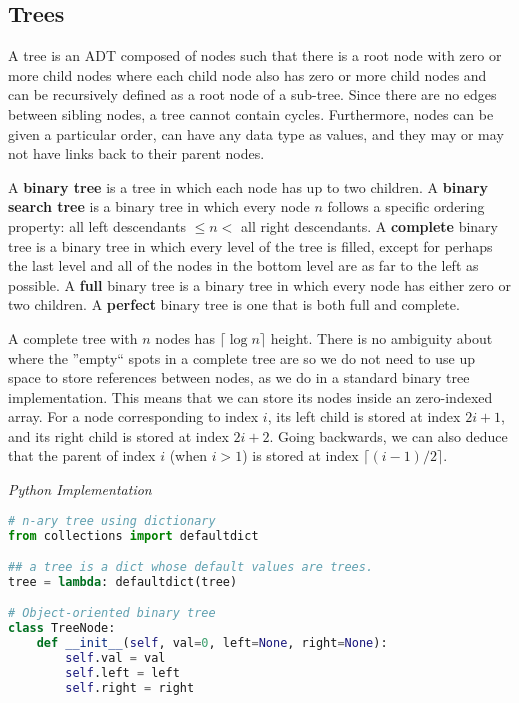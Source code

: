 \documentclass{article}
\begin{document}
    \subsection{Trees}
    A tree is an ADT composed of nodes such that there is a root node with zero or more child nodes where each child node also has zero or more child nodes and can be recursively defined as a root node of a sub-tree. Since there are no edges between sibling nodes, a tree cannot contain cycles. Furthermore, nodes can be given a particular order, can have any data type as values, and they may or may not have links back to their parent nodes.
    
    A \textbf{binary tree} is a tree in which each node has up to two children. A \textbf{binary search tree} is a binary tree in which every node $n$ follows a specific ordering property: all left descendants $\leq n <$ all right descendants. A \textbf{complete} binary tree is a binary tree in which every level of the tree is filled, except for perhaps the last level and all of the nodes in the bottom level are as far to the left as possible. A \textbf{full} binary tree is a binary tree in which every node has either zero or two children. A \textbf{perfect} binary tree is one that is both full and complete.
    
    A complete tree with $n$ nodes has $\lceil \log n \rceil$ height. There is no ambiguity about where the ''empty`` spots in a complete tree are so we do not need to use up space to store references between nodes, as we do in a standard binary tree implementation. This means that we can store its nodes inside an zero-indexed array. For a node corresponding to index $i$, its left child is stored at index $2i + 1$, and its right child is stored at index $2i + 2$. Going backwards, we can also deduce that the parent of index $i$ (when $i > 1$) is stored at index $\lceil (i-1)/2 \rceil$.

\vspace{8pt} \emph{Python Implementation}
\begin{lstlisting}[language=Python]
# n-ary tree using dictionary
from collections import defaultdict

## a tree is a dict whose default values are trees. 
tree = lambda: defaultdict(tree)

# Object-oriented binary tree
class TreeNode:
    def __init__(self, val=0, left=None, right=None):
        self.val = val
        self.left = left
        self.right = right
\end{lstlisting}
    
\end{document}
